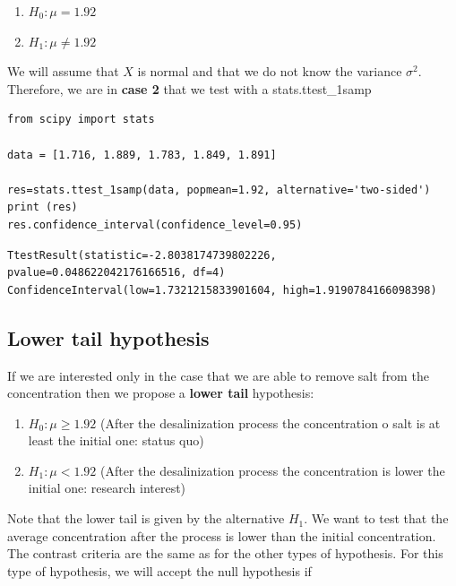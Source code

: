 \documentclass[
]{book}
\providecommand{\tightlist}{%
  \setlength{\itemsep}{0pt}\setlength{\parskip}{0pt}}
\begin{document}
\begin{enumerate}
\def\labelenumi{\alph{enumi}.}
\tightlist
\item
  \(H_0:\mu=1.92\)
\item
  \(H_1:\mu \neq 1.92\)
\end{enumerate}

We will assume that \(X\) is normal and that we do not know the variance \(\sigma^2\). Therefore, we are in \textbf{case 2} that we test with a stats.ttest\_1samp

\begin{verbatim}
from scipy import stats

data = [1.716, 1.889, 1.783, 1.849, 1.891]

res=stats.ttest_1samp(data, popmean=1.92, alternative='two-sided')
print (res)
res.confidence_interval(confidence_level=0.95)
\end{verbatim}

\begin{verbatim}
TtestResult(statistic=-2.8038174739802226, pvalue=0.048622042176166516, df=4)
ConfidenceInterval(low=1.7321215833901604, high=1.9190784166098398)
\end{verbatim}

\hypertarget{lower-tail-hypothesis}{%
\subsection{Lower tail hypothesis}\label{lower-tail-hypothesis}}

If we are interested only in the case that we are able to remove salt from the concentration then we propose a \textbf{lower tail} hypothesis:

\begin{enumerate}
\def\labelenumi{\alph{enumi}.}
\tightlist
\item
  \(H_0:\mu \geq 1.92\) (After the desalinization process the concentration o salt is at least the initial one: status quo)
\item
  \(H_1:\mu < 1.92\) (After the desalinization process the concentration is lower the initial one: research interest)
\end{enumerate}

Note that the lower tail is given by the alternative \(H_1\). We want to test that the average concentration after the process is lower than the initial concentration. The contrast criteria are the same as for the other types of hypothesis. For this type of hypothesis, we will accept the null hypothesis if
\end{document}
